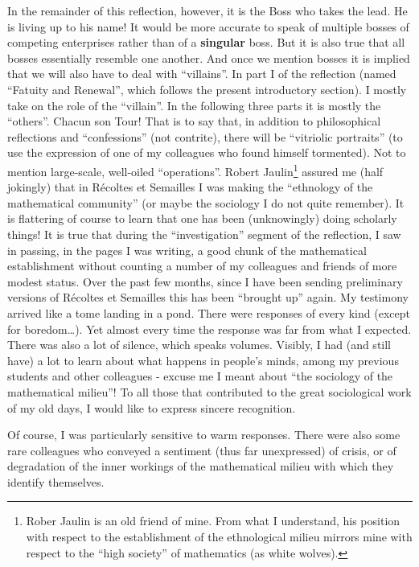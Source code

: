 In the remainder of this reflection, however, it is the Boss who takes the lead. 
He is living up to his name! It would be more accurate 
to speak of multiple bosses of competing enterprises rather than of a \textbf{singular}
boss.
But it is also true that all bosses essentially resemble one another.
And once we mention bosses it is implied that we will also have to deal with ``villains''.
In part I of the reflection (named ``Fatuity and Renewal'', which follows the present
introductory section). I mostly take on the role of the ``villain''. In the following
three parts it is mostly the ``others''. 
Chacun son Tour!
That is to say that, in addition to philosophical reflections and ``confessions''
(not contrite), there will be ``vitriolic portraits'' (to use the expression of one of my
colleagues who found himself tormented). 
Not to mention large-scale, well-oiled ``operations''.
Robert Jaulin\footnote{Rober Jaulin is an old friend of mine. From what I understand, his position
with respect to the establishment of the ethnological milieu mirrors mine with respect to
the ``high society'' of mathematics (as white wolves).} assured me (half jokingly) that in 
R\'ecoltes et Semailles I was making the ``ethnology
of the mathematical community'' (or maybe the sociology I do not quite remember).
It is flattering of course to learn
that one has been (unknowingly) doing scholarly things!
It is true that during the ``investigation'' segment of the reflection, I saw in passing,
in the pages I was writing, a good chunk of the mathematical establishment
without counting a number of my colleagues and friends of more modest status.
Over the past few months, since I have been sending preliminary versions of
R\'ecoltes et Semailles 
this has been ``brought up'' again. My testimony arrived like a tome landing in a pond. 
There were responses of every kind (except for boredom\ldots). 
Yet almost every time the response was far from what I expected. 
There was also a lot of silence, which speaks volumes. 
Visibly, I had (and still have) a lot to learn about what happens in people's minds, among
my previous students and other colleagues - excuse me I meant about ``the sociology of the
mathematical milieu''!
To all those that contributed to the great sociological work of my old days, I would like
to express sincere recognition.

Of course, I was particularly sensitive to warm responses. There were also some rare
colleagues who conveyed a sentiment (thus far unexpressed) of crisis, or of 
degradation of
the inner workings of the mathematical milieu with which they identify themselves. 

